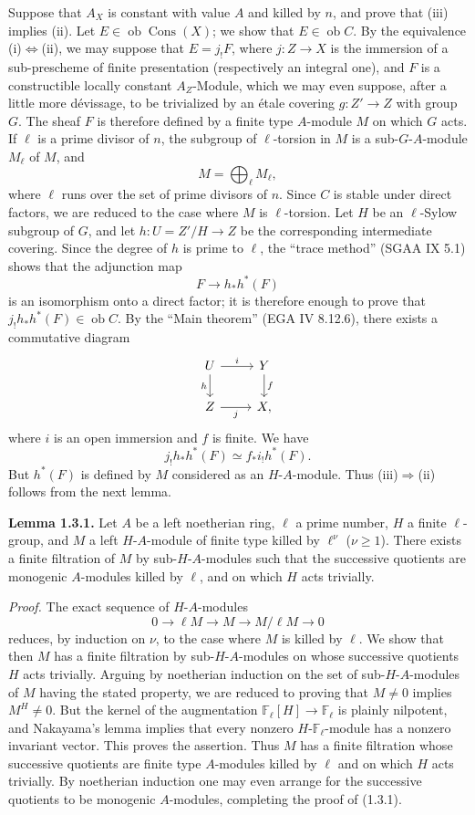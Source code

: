 \documentclass[11pt]{article}
\providecommand{\Cons}{\operatorname{Cons}}
\newcommand{\F}{\mathbb{F}}
\newcommand{\ob}{\operatorname{ob}}
\providecommand{\ob}{\operatorname{ob}}
\begin{document}
Suppose that $A_X$ is constant with value $A$ and killed by $n$, and prove that (iii) implies (ii). Let $E\in\ob\Cons(X)$; we show that $E\in\ob C$. By the equivalence (i)$\Leftrightarrow$(ii), we may suppose that $E=j_!F$, where $j:Z\to X$ is the immersion of a sub-prescheme of finite presentation (respectively an integral one), and $F$ is a constructible locally constant $A_Z$-Module, which we may even suppose, after a little more dévissage, to be trivialized by an étale covering $g:Z'\to Z$ with group $G$. The sheaf $F$ is therefore defined by a finite type $A$-module $M$ on which $G$ acts. If $\ell$ is a prime divisor of $n$, the subgroup of $\ell$-torsion in $M$ is a sub-$G$-$A$-module $M_\ell$ of $M$, and
\[
        M=\bigoplus_\ell M_\ell,
\]
where $\ell$ runs over the set of prime divisors of $n$. Since $C$ is stable under direct factors, we are reduced to the case where $M$ is $\ell$-torsion. Let $H$ be an $\ell$-Sylow subgroup of $G$, and let $h:U=Z'/H\to Z$ be the corresponding intermediate covering. Since the degree of $h$ is prime to $\ell$, the ``trace method'' (SGAA IX 5.1) shows that the adjunction map
\[
        F\longrightarrow h_*h^*(F)
\]
is an isomorphism onto a direct factor; it is therefore enough to prove that $j_!h_*h^*(F)\in\ob C$. By the ``Main theorem'' (EGA IV 8.12.6), there exists a commutative diagram
\[
\begin{tikzcd}
U \arrow[r,"i"] \arrow[d,"h"'] & Y \arrow[d,"f"]\\
Z \arrow[r,"j"'] & X,
\end{tikzcd}
\]
where $i$ is an open immersion and $f$ is finite. We have
\[
        j_!h_*h^*(F) \simeq f_* i_! h^*(F).
\]
But $h^*(F)$ is defined by $M$ considered as an $H$-$A$-module. Thus (iii)$\Rightarrow$(ii) follows from the next lemma.

\textbf{Lemma 1.3.1.} Let $A$ be a left noetherian ring, $\ell$ a prime number, $H$ a finite $\ell$-group, and $M$ a left $H$-$A$-module of finite type killed by $\ell^\nu$ ($\nu\geq1$). There exists a finite filtration of $M$ by sub-$H$-$A$-modules such that the successive quotients are monogenic $A$-modules killed by $\ell$, and on which $H$ acts trivially.

\emph{Proof.} The exact sequence of $H$-$A$-modules
\[
        0\longrightarrow \ell M\longrightarrow M\longrightarrow M/\ell M\longrightarrow 0
\]
reduces, by induction on $\nu$, to the case where $M$ is killed by $\ell$. We show that then $M$ has a finite filtration by sub-$H$-$A$-modules on whose successive quotients $H$ acts trivially. Arguing by noetherian induction on the set of sub-$H$-$A$-modules of $M$ having the stated property, we are reduced to proving that $M\neq0$ implies $M^H\neq0$. But the kernel of the augmentation $\F_\ell[H]\to\F_\ell$ is plainly nilpotent, and Nakayama's lemma implies that every nonzero $H$-$\F_\ell$-module has a nonzero invariant vector. This proves the assertion. Thus $M$ has a finite filtration whose successive quotients are finite type $A$-modules killed by $\ell$ and on which $H$ acts trivially. By noetherian induction one may even arrange for the successive quotients to be monogenic $A$-modules, completing the proof of (1.3.1).
\end{document}
